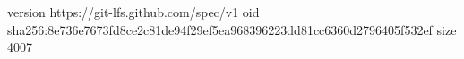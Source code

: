 version https://git-lfs.github.com/spec/v1
oid sha256:8e736e7673fd8ce2c81de94f29ef5ea968396223dd81cc6360d2796405f532ef
size 4007
